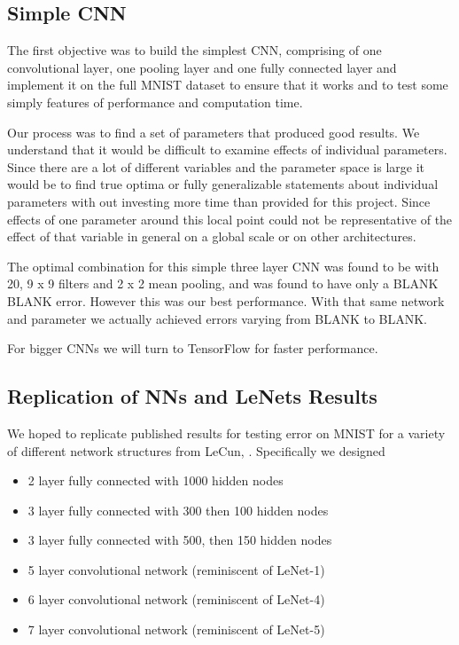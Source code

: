 \documentclass[12pt, twocolumn]{article}
\begin{document}
\subsection{Simple CNN}
The first objective was to build the simplest CNN, comprising of one convolutional layer, one pooling layer and one fully connected layer and implement it on the full MNIST dataset to ensure that it works and to test some simply features of performance and computation time.  

Our process was to find a set of parameters that produced good results. We understand that it would be difficult to examine effects of individual parameters. Since there are a lot of different variables and the parameter space is large it would be to find true optima or fully generalizable statements about individual parameters with out investing more time than provided for this project. Since effects of one parameter around this local point could not be representative of the effect of that variable in general on a global scale or on other architectures. 

The optimal combination for this simple three layer CNN was found to be with 20, 9 x 9 filters and 2 x 2 mean pooling, and was found to have only a BLANK  BLANK error. However this was our best performance. With that same network and parameter we actually achieved errors varying from BLANK to BLANK. 


For bigger CNNs we will turn to TensorFlow for faster performance. 
\subsection{Replication of NNs and LeNets Results}

We hoped to replicate published results for testing error on MNIST for a variety of different network structures from LeCun, \cite{LeCun1998}. Specifically we designed

\begin{itemize}
\item{2 layer fully connected with 1000 hidden nodes}
\item{3 layer fully connected with 300 then 100 hidden nodes}
\item{3 layer fully connected with 500, then 150 hidden nodes}
\item{5 layer convolutional network (reminiscent of LeNet-1)}
\item{6 layer convolutional network (reminiscent of LeNet-4)}
\item{7 layer convolutional network (reminiscent of LeNet-5)}
\end{itemize}
\end{document}

